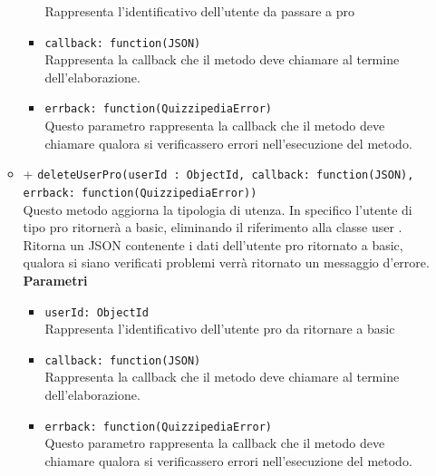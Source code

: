 \begin{itemize}
\begin{itemize}
\begin{itemize}
				Rappresenta l'identificativo dell'utente da passare a pro
			\item	
				\texttt{callback: function(JSON)} \\
				Rappresenta la callback che il metodo deve chiamare al termine dell'elaborazione.	
			\item	
				\texttt{errback: function(QuizzipediaError)} \\
				Questo parametro rappresenta la callback che il metodo deve chiamare qualora si verificassero errori nell'esecuzione del metodo.		
			\end{itemize}	
		\item	
		+ \texttt{deleteUserPro(userId : ObjectId, callback: function(JSON), errback: function(QuizzipediaError))} \\	
		Questo metodo aggiorna la tipologia di utenza. In specifico l'utente di tipo pro ritornerà a basic, eliminando il riferimento alla classe user . Ritorna un JSON contenente i dati dell'utente pro ritornato a basic, qualora si siano verificati problemi verrà ritornato un messaggio d'errore.	\\	
		\textbf{Parametri} 
			\begin{itemize}
			\item
				\texttt{userId: ObjectId} \\
				Rappresenta l'identificativo dell'utente pro da ritornare a basic
			\item	
				\texttt{callback: function(JSON)} \\
				Rappresenta la callback che il metodo deve chiamare al termine dell'elaborazione.	
			\item	
				\texttt{errback: function(QuizzipediaError)} \\
				Questo parametro rappresenta la callback che il metodo deve chiamare qualora si verificassero errori nell'esecuzione del metodo.		
			\end{itemize}		
		\end{itemize}
		
\end{itemize}